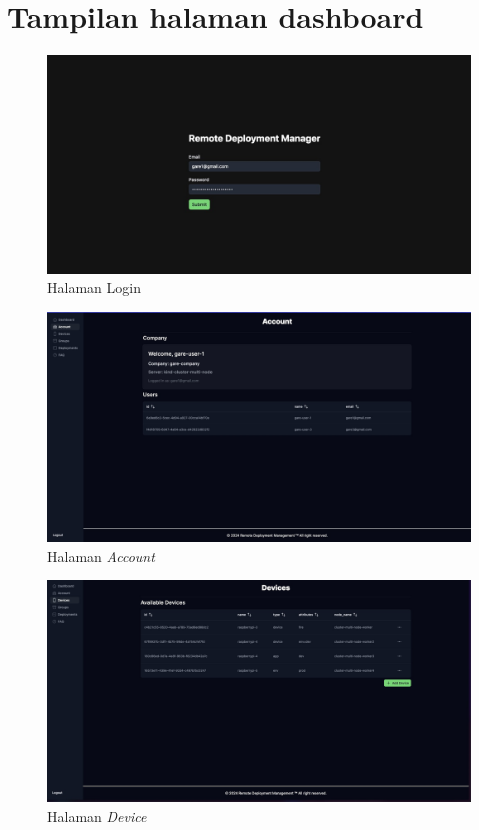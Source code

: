 \chapter{Tampilan halaman dashboard}
\label{appendix:tampilan-halaman-dashboard}

\begin{figure}[ht]
  \centering
  \includegraphics[width=1\textwidth]{resources/chapter-4/dashboard/login-page.jpg}
  \caption{Halaman Login}
  \label{fig:halaman-login}
\end{figure}

\begin{figure}[ht]
  \centering
  \includegraphics[width=1\textwidth]{resources/chapter-4/dashboard/account-page.jpg}
  \caption{Halaman \textit{Account}}
  \label{fig:halaman-account}
\end{figure}

\begin{figure}[ht]
  \centering
  \includegraphics[width=1\textwidth]{resources/chapter-4/dashboard/device-page.jpg}
  \caption{Halaman \textit{Device}}
  \label{fig:halaman-device}
\end{figure}

